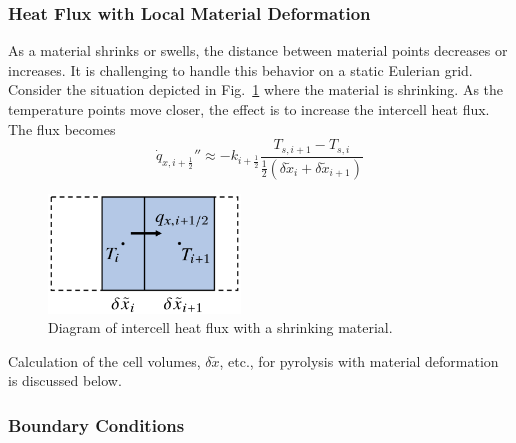 \subsubsection*{Heat Flux with Local Material Deformation}
\label{sec:heat_flux2}

As a material shrinks or swells, the distance between material points decreases or increases.  It is challenging to handle this behavior on a static Eulerian grid.  Consider the situation depicted in Fig.~\ref{fig:flux_deform} where the material is shrinking.  As the temperature points move closer, the effect is to increase the intercell heat flux.  The flux becomes
\begin{equation}
\label{eq:fluxdef}
\dot{q}_{x,i+\frac{1}{2}}'' \approx - k_{i+\frac{1}{2}} \frac{ T_{s,i+1}-T_{s,i}}{\frac{1}{2}(\delta \tilde{x}_i + \delta \tilde{x}_{i+1})}
\end{equation}

\begin{figure}
\centering
\includegraphics[height=1.25in]{FIGURES/flux_deform}
\caption{Diagram of intercell heat flux with a shrinking material.}
\label{fig:flux_deform}
\end{figure}

\noindent Calculation of the cell volumes, $\delta \tilde{x}$, etc., for pyrolysis with material deformation is discussed below.

\subsubsection*{Boundary Conditions}
\label{sec:boundary_conditions}

